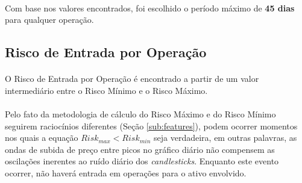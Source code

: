 \paragraph{} Com base nos valores encontrados, foi escolhido o período máximo de \textbf{45 dias} para qualquer operação.





\FloatBarrier
\subsection{Risco de Entrada por Operação}
\label{sub:operation_risk}

\paragraph{} O Risco de Entrada por Operação é encontrado a partir de um valor intermediário entre o Risco Mínimo e o Risco Máximo.

\paragraph{} Pelo fato da metodologia de cálculo do Risco Máximo e do Risco Mínimo seguirem raciocínios diferentes (Seção \ref{sub:features}), podem ocorrer momentos nos quais a equação \begin{math} Risk_{max} < Risk_{min} \end{math} seja verdadeira, em outras palavras, as ondas de subida de preço entre picos no gráfico diário não compensem as oscilações inerentes ao ruído diário dos \textit{candlesticks}. Enquanto este evento ocorrer, não haverá entrada em operações para o ativo envolvido.

